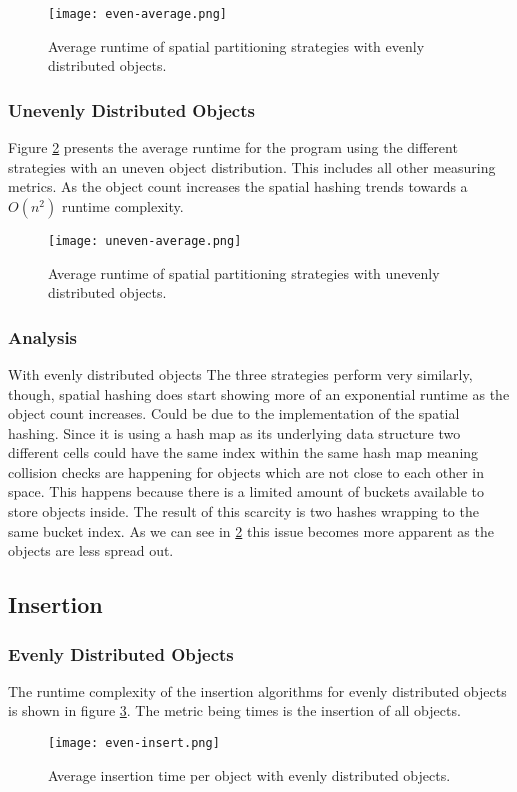 \documentclass[a4paper, 12pt]{article}
\begin{document}
\begin{figure}[H]
    \centering
    \texttt{[image: even-average.png]}
    \caption{Average runtime of spatial partitioning strategies with evenly
    distributed objects.}
    \label{fig:even-average}
\end{figure}

\subsubsection{Unevenly Distributed Objects}
Figure \ref{fig:uneven-average} presents the average runtime for the program
using the different strategies with an uneven object distribution. This includes
all other measuring metrics. As the object count increases the spatial hashing
trends towards a $O(n^2)$ runtime complexity.
\begin{figure}[H]
    \centering
    \texttt{[image: uneven-average.png]}
    \caption{Average runtime of spatial partitioning strategies with unevenly
    distributed objects.}
    \label{fig:uneven-average}
\end{figure}

\subsubsection{Analysis}

With evenly distributed objects The three strategies perform very similarly,
though, spatial hashing does start showing more of an exponential runtime as the
object count increases. Could be due to the implementation of the spatial
hashing. Since it is using a hash map as its underlying data structure two
different cells could have the same index within the same hash map meaning
collision checks are happening for objects which are not close to each other in
space. This happens because there is a limited amount of buckets available to
store objects inside. The result of this scarcity is two hashes wrapping to the
same bucket index. As we can see in \ref{fig:uneven-average} this issue becomes
more apparent as the objects are less spread out.

\subsection{Insertion}

\subsubsection{Evenly Distributed Objects}
The runtime complexity of the insertion algorithms for evenly distributed
objects is shown in figure \ref{fig:even-insert}. The metric being times is the
insertion of all objects.
\begin{figure}[H]
    \centering
    \caption{Average insertion time per object with evenly distributed objects.}
    \texttt{[image: even-insert.png]}
    \label{fig:even-insert}
\end{figure}
\end{document}
